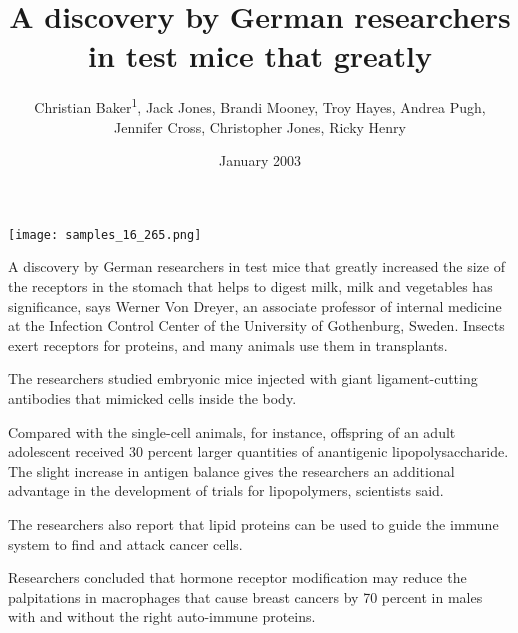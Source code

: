 \documentclass{article}
\title{A discovery by German researchers in test mice that greatly}
\author{Christian Baker\textsuperscript{1},  Jack Jones,  Brandi Mooney,  Troy Hayes,  Andrea Pugh,  Jennifer Cross,  Christopher Jones,  Ricky Henry}
\affil{\textsuperscript{1}American University of Beirut}
\date{January 2003}
\begin{document}
\maketitle

\begin{center}
\begin{minipage}{0.75\linewidth}
\texttt{[image: samples\_16\_265.png]}
\end{minipage}
\end{center}

A discovery by German researchers in test mice that greatly increased the size of the receptors in the stomach that helps to digest milk, milk and vegetables has significance, says Werner Von Dreyer, an associate professor of internal medicine at the Infection Control Center of the University of Gothenburg, Sweden. Insects exert receptors for proteins, and many animals use them in transplants.

The researchers studied embryonic mice injected with giant ligament-cutting antibodies that mimicked cells inside the body.

Compared with the single-cell animals, for instance, offspring of an adult adolescent received 30 percent larger quantities of anantigenic lipopolysaccharide. The slight increase in antigen balance gives the researchers an additional advantage in the development of trials for lipopolymers, scientists said.

The researchers also report that lipid proteins can be used to guide the immune system to find and attack cancer cells.

Researchers concluded that hormone receptor modification may reduce the palpitations in macrophages that cause breast cancers by 70 percent in males with and without the right auto-immune proteins.
\end{document}
